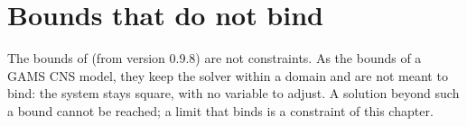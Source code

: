 \section{Bounds that do not bind}

The bounds of  (from version 0.9.8) are not constraints. As
the bounds of a GAMS CNS model, they keep the solver within a domain and are
not meant to bind: the system stays square, with no variable to adjust. A
solution beyond such a bound cannot be reached; a limit that binds is a
constraint of this chapter.

